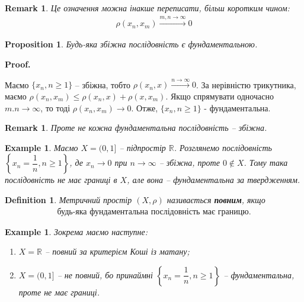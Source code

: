 \documentclass[a4paper, 10pt]{article}
\makeatletter
\theoremstyle{theoremdd}
\theoremstyle{theoremdd}
\newtheorem{definition}[theorem]{Definition}
\theoremstyle{theoremdd}
\theoremstyle{theoremdd}
\newtheorem{example}[theorem]{Example}
\theoremstyle{theoremdd}
\newtheorem{proposition}[theorem]{Proposition}
\theoremstyle{theoremdd}
\newtheorem{remark}[theorem]{Remark}
\theoremstyle{theoremdd}
\theoremstyle{theoremdd}
\renewenvironment{proof}[1][Proof.\\]{\par
\pushQED{\hfill \qed}%
\normalfont \topsep6\p@\@plus6\p@\relax
\trivlist
\item\relax
{\bfseries
#1\@addpunct{.}}\hspace\labelsep\ignorespaces
}{%
\popQED\endtrivlist\@endpefalse
}
\makeatother
\begin{document}
\begin{remark}
Це означення можна інакше переписати, більш коротким чином:
\begin{align*}
\rho(x_n,x_m) \overset{m,n \to \infty}{\longrightarrow} 0
\end{align*}
\end{remark}

\begin{proposition}
Будь-яка збіжна послідовність є фундаментальною.
\end{proposition}

\begin{proof}
Маємо $\{x_n, n \geq 1\}$ -- збіжна, тобто $\rho(x_n,x) \overset{n \to \infty}{\longrightarrow} 0$. За нерівністю трикутника, маємо $\rho(x_n,x_m) \leq \rho(x_n,x) + \rho(x,x_m)$. Якщо спрямувати одночасно $m.n \to \infty$, то тоді $\rho(x_n,x_m) \to 0$. Отже, $\{x_n, n \geq 1\}$ - фундаментальна.
\end{proof}

\begin{remark}
Проте не кожна фундаментальна послідовність -- збіжна.
\end{remark}

\begin{example}
Маємо $X = (0,1]$ -- підпростір $\mathbb{R}$. Розглянемо послідовність $\left\{ x_n = \dfrac{1}{n}, n \geq 1 \right\}$, де $x_n \to 0$ при $n \to \infty$ -- збіжна, проте $0 \not\in X$. Тому така послідовність не має границі в $X$, але вона -- фундаментальна за твердженням.
\end{example}

\begin{definition}
Метричний простір $(X, \rho)$ називається \textbf{повним}, якщо 
\begin{align*}
\text{будь-яка фундаментальна послідовність має границю.}
\end{align*}
\end{definition}

\begin{example} 
Зокрема маємо наступне:
\begin{enumerate}[nosep,wide=0pt,label={\arabic*)}]
\item $X = \mathbb{R}$ -- повний за критерієм Коші із матану;\\
\item $X = (0,1]$ -- не повний, бо принаймні $\left\{x_n = \dfrac{1}{n}, n \geq 1 \right\}$ -- фундаментальна, проте не має границі.
\end{enumerate}
\end{example}
\end{document}
